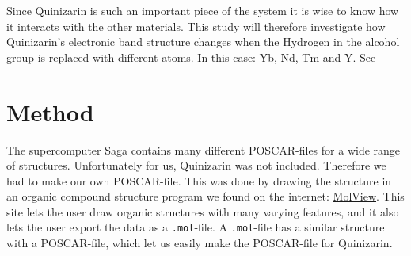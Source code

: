 \documentclass{article}
\begin{document}
    Since Quinizarin is such an important piece of the system it is wise to know how it interacts with the other materials. This study will therefore investigate how Quinizarin's electronic band structure changes when the Hydrogen in the alcohol group is replaced with different atoms. In this case: Yb, Nd, Tm and Y. See %

\vspace{1cm}

\section{Method}    \label{sec:Method}

  The supercomputer Saga contains many different POSCAR-files for a wide range of structures. Unfortunately for us, Quinizarin was not included. Therefore we had to make our own POSCAR-file. This was done by drawing the structure in an organic compound structure program we found on the internet: \href{https://molview.org}{MolView}. This site lets the user draw organic structures with many varying features, and it also lets the user export the data as a \texttt{.mol}-file. A \texttt{.mol}-file has a similar structure with a POSCAR-file, which let us easily make the POSCAR-file for Quinizarin. \\
\end{document}
